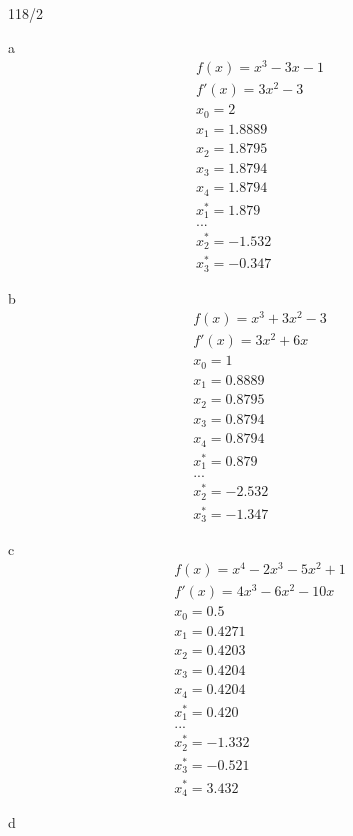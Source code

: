 \begin{exercise}{118/2}
  \item [a]
  \begin{gather*}
    f(x) = x^3 - 3x - 1 \\
    f'(x) = 3x^2 - 3 \\
    x_0 = 2 \\
    x_1 = 1.8889 \\
    x_2 = 1.8795 \\
    x_3 = 1.8794 \\
    x_4 = 1.8794 \\
    x_1^\ast = 1.879 \\
    ...\\
    x_2^\ast = -1.532 \\
    x_3^\ast = -0.347
  \end{gather*}
  \item [b]
  \begin{gather*}
    f(x) = x^3 + 3x^2 - 3 \\
    f'(x) = 3x^2 + 6x \\
    x_0 = 1 \\
    x_1 = 0.8889 \\
    x_2 = 0.8795 \\
    x_3 = 0.8794 \\
    x_4 = 0.8794 \\
    x_1^\ast = 0.879 \\
    ...\\
    x_2^\ast = -2.532 \\
    x_3^\ast = -1.347
  \end{gather*}
  \item [c]
  \begin{gather*}
    f(x) = x^4 - 2x^3 - 5x^2 + 1 \\
    f'(x) = 4x^3 - 6x^2 - 10x \\
    x_0 = 0.5 \\
    x_1 = 0.4271 \\
    x_2 = 0.4203 \\
    x_3 = 0.4204 \\
    x_4 = 0.4204 \\
    x_1^\ast = 0.420 \\
    ... \\
    x_2^\ast = -1.332 \\
    x_3^\ast = -0.521 \\
    x_4^\ast = 3.432
  \end{gather*}
  \item [d]
  \begin{gather*}

\end{gather*}
\end{exercise}
